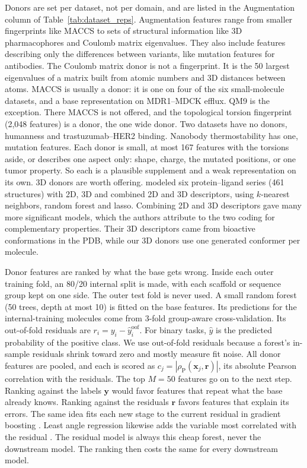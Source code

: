 Donors are set per dataset, not per domain, and are listed in the Augmentation column of Table~\ref{tab:dataset_reps}. Augmentation features range from smaller fingerprints like MACCS to sets of structural information like 3D pharmacophores and Coulomb matrix eigenvalues. They also include features describing only the differences between variants, like mutation features for antibodies. The Coulomb matrix donor is not a fingerprint. It is the 50 largest eigenvalues of a matrix built from atomic numbers and 3D distances between atoms. MACCS is usually a donor: it is one on four of the six small-molecule datasets, and a base representation on MDR1--MDCK efflux. QM9 is the exception. There MACCS is not offered, and the topological torsion fingerprint (2,048 features) is a donor, the one wide donor. Two datasets have no donors, humanness and trastuzumab--HER2 binding. Nanobody thermostability has one, mutation features. Each donor is small, at most 167 features with the torsions aside, or describes one aspect only: shape, charge, the mutated positions, or one tumor property. So each is a plausible supplement and a weak representation on its own. 3D donors are worth offering. \citet{Bahia2023} modeled six protein--ligand series (461 structures) with 2D, 3D and combined 2D and 3D descriptors, using $k$-nearest neighbors, random forest and lasso. Combining 2D and 3D descriptors gave many more significant models, which the authors attribute to the two coding for complementary properties. Their 3D descriptors came from bioactive conformations in the PDB, while our 3D donors use one generated conformer per molecule.

Donor features are ranked by what the base gets wrong. Inside each outer training fold, an 80/20 internal split is made, with each scaffold or sequence group kept on one side. The outer test fold is never used. A small random forest (50 trees, depth at most 10) is fitted on the base features. Its predictions for the internal-training molecules come from 3-fold group-aware cross-validation. Its out-of-fold residuals are $r_i = y_i - \hat{y}^{\mathrm{oof}}_i$. For binary tasks, $\hat{y}$ is the predicted probability of the positive class. We use out-of-fold residuals because a forest's in-sample residuals shrink toward zero and mostly measure fit noise. All donor features are pooled, and each is scored as $c_j = |\rho_{\mathrm{P}}(\mathbf{x}_j, \mathbf{r})|$, its absolute Pearson correlation with the residuals. The top $M = 50$ features go on to the next step. Ranking against the labels $\mathbf{y}$ would favor features that repeat what the base already knows. Ranking against the residuals $\mathbf{r}$ favors features that explain its errors. The same idea fits each new stage to the current residual in gradient boosting \citep{friedman2001greedy}. Least angle regression likewise adds the variable most correlated with the residual \citep{efron2004lars}. The residual model is always this cheap forest, never the downstream model. The ranking then costs the same for every downstream model.

